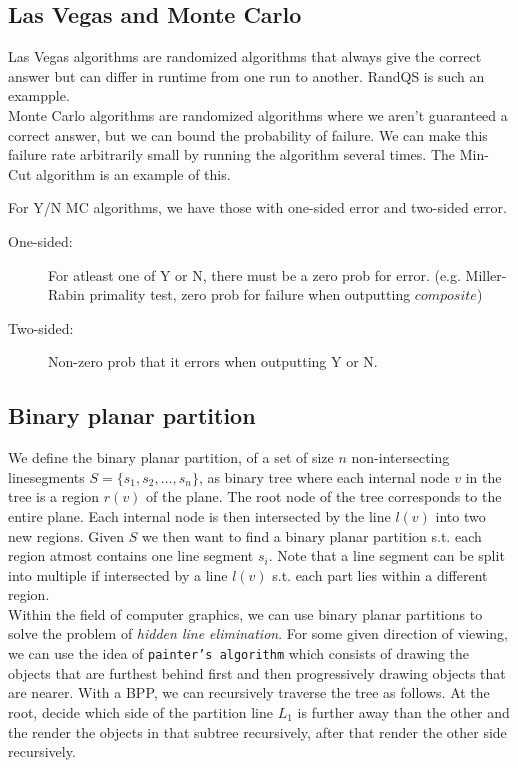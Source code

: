 \documentclass[a4paper]{article}
\begin{document}
\subsection{Las Vegas and Monte Carlo}
Las Vegas algorithms are randomized algorithms that always give the correct answer but can differ in runtime from one run to another. RandQS is such an exampple.\\

Monte Carlo algorithms are randomized algorithms where we aren't guaranteed a correct answer, but we can bound the probability of failure. We can make this failure rate arbitrarily small by running the algorithm several times. The Min-Cut algorithm is an example of this.

For Y/N MC algorithms, we have those with one-sided error and two-sided error.
\begin{description}
  \item[One-sided:] For atleast one of Y or N, there must be a zero prob for error. (e.g. Miller-Rabin primality test, zero prob for failure when outputting $composite$)
  \item[Two-sided:] Non-zero prob that it errors when outputting Y or N.
\end{description}
\subsection{Binary planar partition}
We define the binary planar partition, of a set of size $n$ non-intersecting linesegments $S=\{s_1,s_2, \ldots, s_n\}$, as binary tree where each internal node $v$ in the tree is a region $r(v)$ of the plane. The root node of the tree corresponds to the entire plane. Each internal node is then intersected by the line $l(v)$ into two new regions. Given $S$ we then want to find a binary planar partition s.t. each region atmost contains one line segment $s_i$. Note that a line segment can be
split into multiple if intersected by a line $l(v)$ s.t. each part lies within a different region.\\


Within the field of computer graphics, we can use binary planar partitions to solve the problem of \textit{hidden line elimination}. For some given direction of viewing, we can use the idea of \texttt{painter's algorithm} which consists of drawing the objects that are furthest behind first and then progressively drawing objects that are nearer. With a BPP, we can recursively traverse the tree as follows. At the root, decide which side of the partition line $L_1$ is further away than the other
and the render the objects in that subtree recursively, after that render the other side recursively.
\end{document}
